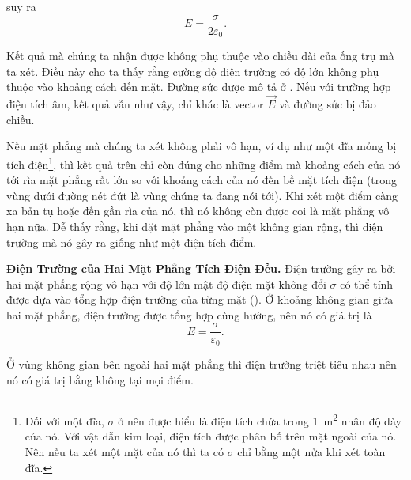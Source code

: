 \noindent
suy ra
\begin{equation}\label{eq:1_120}
	E = \frac{\sigma}{2\varepsilon_0}.
\end{equation}

\noindent
Kết quả mà chúng ta nhận được không phụ thuộc vào chiều dài của ống trụ mà ta xét. Điều này cho ta thấy rằng cường độ điện trường có độ lớn không phụ thuộc vào khoảng cách đến mặt. Đường sức được mô tả ở . Nếu với trường hợp điện tích âm, kết quả vẫn như vậy, chỉ khác là vector $\vec{E}$ và đường sức bị đảo chiều.

Nếu mặt phẳng mà chúng ta xét không phải vô hạn, ví dụ như một đĩa mỏng bị tích điện\footnote{Đối với một đĩa, $\sigma$ ở  nên được hiểu là điện tích chứa trong \SI{1}{\metre\squared} nhân độ dày của nó. Với vật dẫn kim loại, điện tích được phân bố trên mặt ngoài của nó. Nên nếu ta xét một mặt của nó thì ta có $\sigma$ chỉ bằng một nửa khi xét toàn đĩa.}, thì kết quả trên chỉ còn đúng cho những điểm mà khoảng cách của nó tới rìa mặt phẳng rất lớn so với khoảng cách của nó đến bề mặt tích điện (trong  vùng dưới đường nét đứt là vùng chúng ta đang nói tới). Khi xét một điểm càng xa bản tụ hoặc đến gần rìa của nó, thì nó không còn được coi là mặt phẳng vô hạn nữa. Dễ thấy rằng, khi đặt mặt phẳng vào một không gian rộng, thì điện trường mà nó gây ra giống như một điện tích điểm.

\textbf{Điện Trường của Hai Mặt Phẳng Tích Điện Đều.} Điện trường gây ra bởi hai mặt phẳng rộng vô hạn với độ lớn mật độ điện mặt không đổi $\sigma$ có thể tính được dựa vào tổng hợp điện trường của từng mặt (). Ở khoảng không gian giữa hai mặt phẳng, điện trường được tổng hợp cùng hướng, nên nó có giá trị là
\begin{equation}\label{eq:1_121}
	E = \frac{\sigma}{\varepsilon_0}.
\end{equation}

\noindent
Ở vùng không gian bên ngoài hai mặt phẳng thì điện trường triệt tiêu nhau nên nó có giá trị bằng không tại mọi điểm.

